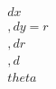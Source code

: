\documentclass[preview]{standalone}
\begin{document}
\begin{align*}
dx \\, dy = r \\, dr \\, d\\theta
\end{align*}
\end{document}

